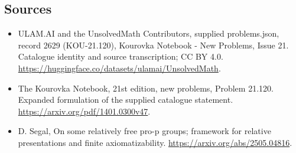 \documentclass[11pt,a4paper]{article}
\begin{document}
\subsection{Sources}
\begin{itemize}
\item[S1] ULAM.AI and the UnsolvedMath Contributors, supplied problems.json, record 2629 (KOU-21.120), Kourovka Notebook - New Problems, Issue 21. Catalogue identity and source transcription; CC BY 4.0.
\url{https://huggingface.co/datasets/ulamai/UnsolvedMath}.
\item[S2] The Kourovka Notebook, 21st edition, new problems, Problem 21.120. Expanded formulation of the supplied catalogue statement.
\url{https://arxiv.org/pdf/1401.0300v47}.
\item[S3] D. Segal, On some relatively free pro-p groups; framework for relative presentations and finite axiomatizability.
\url{https://arxiv.org/abs/2505.04816}.
\end{itemize}
\end{document}
